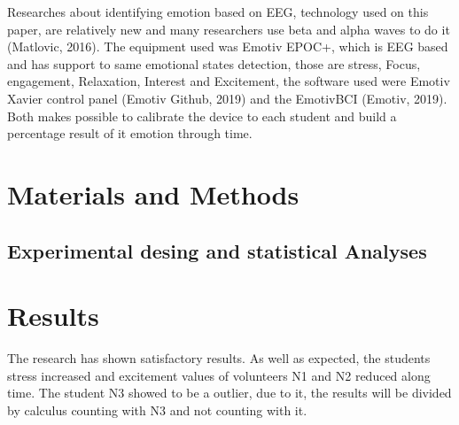 \documentclass[12pt,openright,a4paper]{article}
\begin{document}
Researches about identifying emotion based on EEG, technology used on this paper, are relatively  new and many researchers use beta and alpha waves to do it (Matlovic, 2016). The equipment used was Emotiv EPOC+,  which is EEG based and has support to same emotional states detection, those are stress, Focus, engagement, Relaxation, Interest and Excitement, the software used were Emotiv Xavier control panel (Emotiv Github, 2019) and the EmotivBCI (Emotiv, 2019). Both makes possible to calibrate the device to each student and build a percentage result of it emotion through time.
\section{Materials and Methods}
\subsection{Experimental desing and statistical Analyses}

\section{Results}
 The research has shown satisfactory results. As well as expected, the students stress increased and excitement values of volunteers N1 and N2  reduced along time. The student N3 showed to be a outlier, due to it, the results will be divided by calculus counting with N3 and not counting with it.
 
\end{document}
